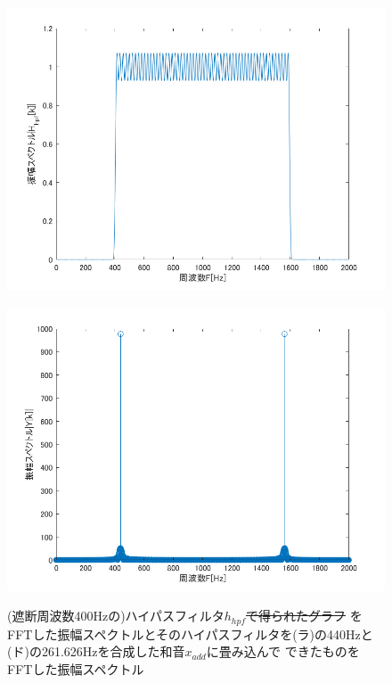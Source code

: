 \documentclass[11pt, a4paper, titlepage]{ltjsarticle}
\begin{document}
\begin{figure}[h]
    \begin{center}
    \begin{minipage}[t]{0.48\columnwidth}
        \includegraphics[width=\columnwidth]{figures/2-4hpf.png}
        \label{fign:2-4hpf}
    \end{minipage}
    \begin{minipage}[t]{0.48\columnwidth}
        \includegraphics[width=\columnwidth]{figures/2-4yh.png}
        \label{fign:2-4yh}
    \end{minipage}
    \end{center}
    \caption{(遮断周波数400Hzの)ハイパスフィルタ$h_{hpf}$\sout{で得られたグラフ}
    をFFTした振幅スペクトルとそのハイパスフィルタを(ラ)の440Hzと(ド)の261.626Hzを合成した和音$x_{add}$に畳み込んで
    できたものをFFTした振幅スペクトル}
\end{figure}
\end{document}
